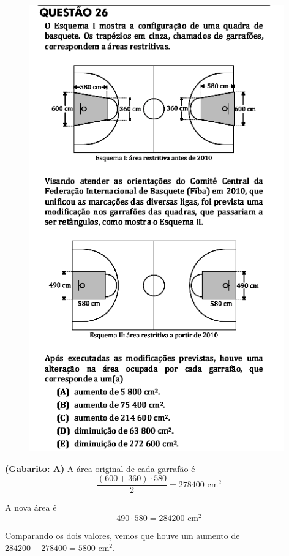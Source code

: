 \documentclass[a4paper]{article}
\begin{document}
\begin{figure}[H]
	\begin{center}
		\includegraphics[width=11cm]{L5Q26.png}
	\end{center}
\end{figure}
\par\textbf{(Gabarito: A)} A área original de cada garrafão é
\begin{equation*}
\frac{(600+360)\cdot 580}{2} = 278400\text{ cm}^2
\end{equation*}
\par\vspace{0.3cm} A nova área é
\begin{equation*}
490\cdot 580 = 284200\text{ cm}^2
\end{equation*}
\par\vspace{0.3cm} Comparando os dois valores, vemos que houve um aumento de $284200-278400 = 5800$ cm$^2$.
\end{document}
